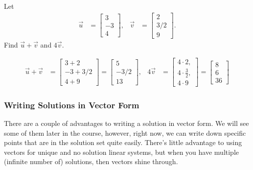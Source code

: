 \begin{example}
Let 
%
\begin{align*}
\vec{u} & = \begin{bmatrix}
3 \\ -3 \\ 4 
\end{bmatrix}, & \vec{v} & = \begin{bmatrix}
2 \\ 3/2 \\ 9 
\end{bmatrix}. 
\end{align*}
Find $\vec{u}+\vec{v}$ and $4 \vec{v}$.  

\solution

\begin{align*}
\vec{u} + \vec{v} & = \begin{bmatrix}
3+2 \\ -3 + 3/2 \\ 4+9 
\end{bmatrix} = \begin{bmatrix}
5 \\ -3/2 \\ 13 
\end{bmatrix}, 
&  4 \vec{v} & = \begin{bmatrix}
4 \cdot 2, \\ 4 \cdot \frac{3}{2}, \\ 4 \cdot 9 
\end{bmatrix} = 
\begin{bmatrix}
8 \\ 6 \\ 36 
\end{bmatrix}
\end{align*}
\end{example}

\subsubsection{Writing Solutions in Vector Form}

There are a couple of advantages to writing a solution in vector form.  We will see some of them later in the course,  however, right now, we can write down specific points that are in the solution set quite easily.  There's little advantage to using vectors for unique and no solution linear systems, but when you have multiple (infinite number of) solutions, then vectors shine through.  

